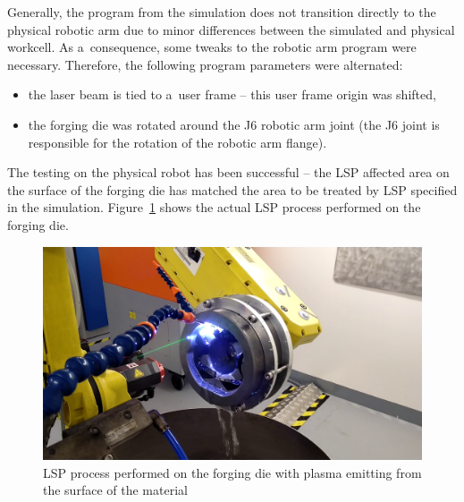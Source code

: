 Generally, the program from the simulation does not transition directly to the physical robotic arm due to minor differences between the simulated and physical workcell.  As a~consequence, some tweaks to the robotic arm program were necessary. Therefore, the following program parameters were alternated:

\begin{itemize}

\item the laser beam is tied to a~user frame -- this user frame origin was shifted,

\item the forging die was rotated around the J6 robotic arm joint (the J6 joint is responsible for the rotation of the robotic arm flange).
 
\end{itemize}
The testing on the physical robot has been successful -- the LSP affected area on the surface of the forging die has matched the area to be treated by LSP specified in the simulation. Figure~\ref{fig:peening} shows the actual LSP process performed on the forging die. 

\begin{figure}[h]
    \centering
    \includegraphics[width=0.9\linewidth]{img/peening_v2.png}
    \caption[LSP process performed on the forging die]{LSP process performed on the forging die with plasma emitting from the surface of the material}
    \label{fig:peening}
\end{figure}



